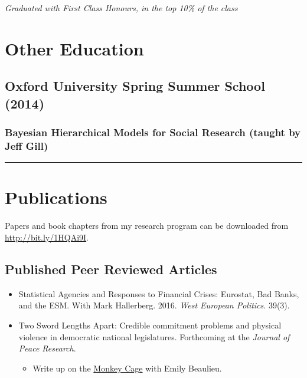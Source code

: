 \documentclass[a4paper]{article}
\begin{document}
{{\emph{Graduated with First Class Honours, in the top 10\% of the class}}

\section*{Other Education}

\subsection*{Oxford University Spring Summer School (2014)}

\subsubsection*{Bayesian Hierarchical Models for Social Research (taught by Jeff Gill)}

\vspace{0.25cm}
\medskip\hrule height 1pt
\vspace{0.5cm}


\section*{Publications}

\noindent Papers and book chapters from my research program can be downloaded from {\url{http://bit.ly/1HQAi9I}}.

\subsection*{Published Peer Reviewed Articles}

\begin{itemize}

    \item Statistical Agencies and Responses to Financial Crises: Eurostat, Bad Banks, and the ESM. With Mark Hallerberg. 2016. {\emph{West European Politics}}. 39(3).

    \item Two Sword Lengths Apart: Credible commitment problems and physical violence in democratic national legislatures. Forthcoming at the \emph{Journal of Peace Research}.

        \begin{itemize}
            \item Write up on the \href{http://t.co/fETbFCXcYU}{Monkey Cage} with Emily Beaulieu.
    \end{itemize}


\end{itemize}}
\end{document}
